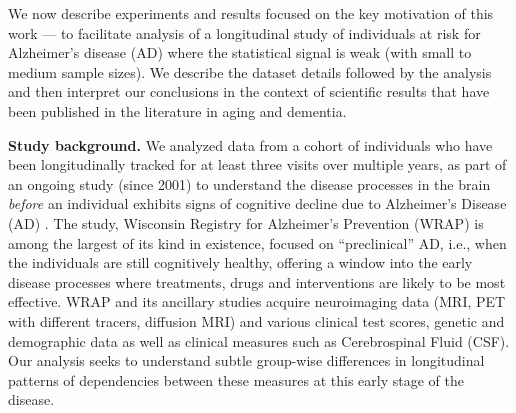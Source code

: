 We now describe experiments and results focused on the key motivation of this work --- to facilitate 
analysis of a longitudinal study of individuals at risk for Alzheimer's disease (AD) where the statistical 
signal is weak (with small to medium sample sizes). We describe the dataset details followed by the analysis and then interpret our conclusions 
in the context of scientific results that have been published in the literature in aging and dementia.

{\bf Study background.} We analyzed data from a 
cohort of individuals who have been longitudinally tracked for at least three visits over multiple years, as part of an ongoing study (since 2001)
to understand the disease processes in the brain {\em before} an individual exhibits signs of 
cognitive decline due to Alzheimer's Disease (AD) \cite{sager2005middle}. The study, Wisconsin Registry for 
Alzheimer's Prevention (WRAP)  
is among the largest of its kind in existence, focused on ``preclinical'' AD, i.e., when the 
individuals are still cognitively healthy, offering a window into the early disease processes 
where treatments, drugs and interventions are likely to be most effective. 
WRAP and its ancillary studies 
acquire neuroimaging data (MRI, PET with different tracers, diffusion MRI) and various clinical test scores, 
genetic and demographic data as well as clinical measures such as Cerebrospinal Fluid (CSF). Our analysis 
seeks to understand subtle group-wise differences in longitudinal patterns of dependencies between these measures at this early stage of the disease. 

